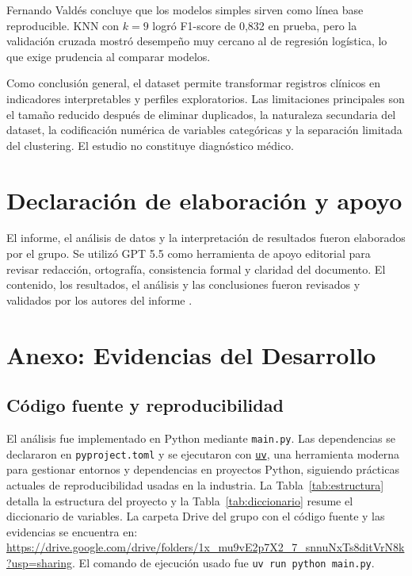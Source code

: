 \documentclass[10pt,a4paper]{article}
\begin{document}
Fernando Valdés concluye que los modelos simples sirven como línea base reproducible. KNN con $k=9$ logró F1-score de 0,832 en prueba, pero la validación cruzada mostró desempeño muy cercano al de regresión logística, lo que exige prudencia al comparar modelos.

Como conclusión general, el dataset permite transformar registros clínicos en indicadores interpretables y perfiles exploratorios. Las limitaciones principales son el tamaño reducido después de eliminar duplicados, la naturaleza secundaria del dataset, la codificación numérica de variables categóricas y la separación limitada del clustering. El estudio no constituye diagnóstico médico.

\section*{Declaración de elaboración y apoyo}

El informe, el análisis de datos y la interpretación de resultados fueron elaborados por el grupo. Se utilizó GPT 5.5 como herramienta de apoyo editorial para revisar redacción, ortografía, consistencia formal y claridad del documento. El contenido, los resultados, el análisis y las conclusiones fueron revisados y validados por los autores del informe \citep{openai2026gpt}.




\newpage
\appendix
\section{Anexo: Evidencias del Desarrollo}

\subsection{Código fuente y reproducibilidad}

El análisis fue implementado en Python mediante \texttt{main.py}. Las dependencias se declararon en \texttt{pyproject.toml} y se ejecutaron con \href{https://docs.astral.sh/uv/}{\texttt{uv}}, una herramienta moderna para gestionar entornos y dependencias en proyectos Python, siguiendo prácticas actuales de reproducibilidad usadas en la industria. La Tabla~\ref{tab:estructura} detalla la estructura del proyecto y la Tabla~\ref{tab:diccionario} resume el diccionario de variables. La carpeta Drive del grupo con el código fuente y las evidencias se encuentra en: \url{https://drive.google.com/drive/folders/1x_mu9vE2p7X2_7_snnuNxTs8ditVrN8k?usp=sharing}. El comando de ejecución usado fue \texttt{uv run python main.py}.
\end{document}

